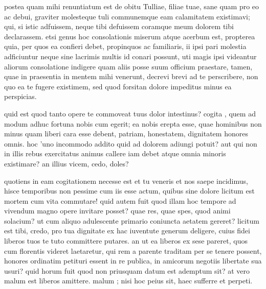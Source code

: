 


 postea quam mihi renuntiatum est de obitu Tulliae, filiae tuae, sane quam pro eo ac debui, graviter molesteque tuli communemque eam calamitatem existimavi; qui, si istic adfuissem, neque tibi defuissem coramque meum dolorem tibi declarassem. etsi genus hoc consolationis miserum atque acerbum est, propterea quia, per quos ea confieri debet, propinquos ac familiaris, ii ipsi pari molestia adficiuntur neque sine lacrimis multis id conari possunt, uti magis ipsi videantur aliorum consolatione indigere quam aliis posse suum officium praestare, tamen, quae in praesentia in mentem mihi venerunt, decrevi brevi ad te perscribere, non quo ea te fugere existimem, sed quod forsitan dolore impeditus minus ea perspicias.

 quid est quod tanto opere te commoveat tuus dolor intestinus? cogita , quem ad modum adhuc fortuna nobis cum egerit; ea nobis erepta esse, quae hominibus non minus quam liberi cara esse debent, patriam, honestatem, dignitatem honores omnis. hoc 'uno incommodo addito quid ad dolorem adiungi potuit? aut qui non in illis rebus exercitatus animus callere iam debet atque omnia minoris existimare? an illius vicem, cedo, doles?

 quotiens in eam cogitationem necesse est et tu veneris et nos saepe incidimus, hisce temporibus non pessime cum iis esse actum, quibus sine dolore licitum est mortem cum vita commutare! quid autem fuit quod illam hoc tempore ad vivendum magno opere invitare posset? quae res, quae spes, quod animi solacium? ut cum aliquo adulescente primario coniuncta aetatem gereret? licitum est tibi, credo, pro tua dignitate ex hac iuventute generum deligere, cuius fidei liberos tuos te tuto committere putares. an ut ea liberos ex sese pareret, quos cum florentis videret laetaretur, qui rem a parente traditam per se tenere possent, honores ordinatim petituri essent in re publica, in amicorum negotiis libertate sua usuri? quid horum fuit quod non priusquam datum est ademptum sit? at vero malum est liberos amittere. malum ; nisi hoc peius sit, haec sufferre et perpeti.

